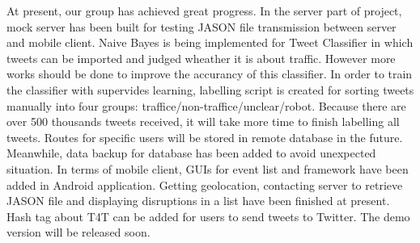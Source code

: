At present, our group has achieved great progress. In the server part of project,  mock server has been built for testing JASON file transmission between server and mobile client. Naive Bayes is being implemented for Tweet Classifier in which tweets can be imported and judged wheather it is about traffic. However more works should be done to improve the accurancy of this classifier. In order to train the classifier with supervides learning, labelling script is created for sorting tweets manually into four groups: traffice/non-traffice/unclear/robot. Because there are over 500 thousands tweets received, it will take more time to finish labelling all tweets. Routes for specific users will be stored in remote database in the future. Meanwhile, data backup for database has been added to avoid unexpected situation. In terms of mobile client, GUIs for event list and framework have been added in Android application. Getting geolocation, contacting server to retrieve JASON file and displaying disruptions in a list have been finished at present. Hash tag about T4T can be added for users to send tweets to Twitter. The demo version will be released soon.
